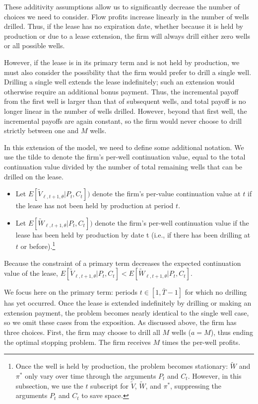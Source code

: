 \documentclass[12pt]{article}
\begin{document}
These additivity assumptions allow us to significantly decrease the number of choices we need to consider. Flow profits increase linearly in the number of wells drilled. Thus, if the lease has no expiration date, whether because it is held by production or due to a lease extension, the firm will always drill either zero wells or all possible wells. 

However, if the lease is in its primary term and is not held by production, we must also consider the possibility that the firm would prefer to drill a single well. Drilling a single well extends the lease indefinitely; such an extension would otherwise require an additional bonus payment. Thus, the incremental payoff from the first well is larger than that of subsequent wells, and total payoff is no longer linear in the number of wells drilled.  However, beyond that first well, the incremental payoffs are again constant, so the firm would never choose to drill strictly between one and $M$ wells.

In this extension of the model, we need to define some additional notation. We use the tilde to denote the firm's per-well continuation value, equal to the total continuation value divided by the number of total remaining wells that can be drilled on the lease.
\begin{itemize} 
	\item Let $E[\tilde{V}_{\ell,t+1,\theta}|P_t,C_t])$ denote the firm's per-value continuation value at $t$ if the lease has not been held by production at period $t$.
	\item Let $E[\tilde{W}_{\ell,t+1,\theta}|P_t,C_t])$ denote the firm's per-well continuation value if the lease has been held by production by date t (i.e., if there has been drilling at $t$ or before).\footnote{Once the well is held by production, the problem becomes stationary: $\tilde{W}$ and $\pi^*$ only vary over time through the arguments $P_t$ and $C_t$. However, in this subsection, we use the $t$ subscript for $\tilde{V}$, $\tilde{W}$, and $\pi^*$, suppressing the arguments $P_t$ and $C_t$ to save space.} 
\end{itemize}
Because the constraint of a primary term decreases the expected continuation value of the lease, $E[\tilde{V}_{\ell,t+1,\theta}|P_t,C_t] < E[\tilde{W}_{\ell,{t+1},\theta}|P_t,C_t]$.

We focus here on the primary term: periods $t \in [1, \bar{T} - 1 ]$ for which no drilling has yet occurred. Once the lease is extended indefinitely by drilling or making an extension payment, the problem becomes nearly identical to the single well case, so we omit these cases from the exposition. As discussed above, the firm has three choices. First, the firm may choose to drill all $M$ wells ($a = M$), thus ending the optimal stopping problem. The firm receives $M$ times the per-well profits.
\end{document}
